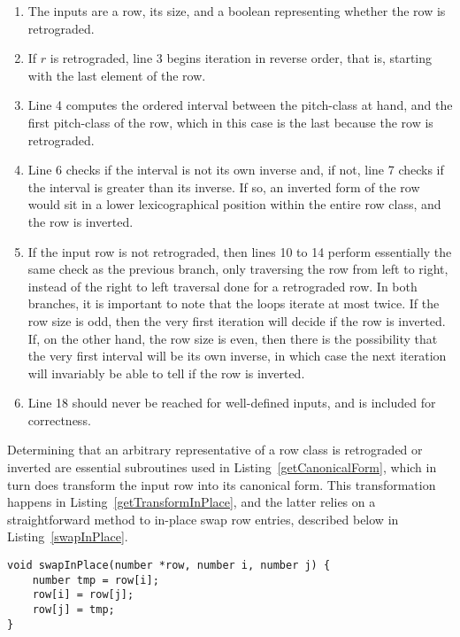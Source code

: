 \begin{enumerate}
\item The inputs are a row, its size, and a boolean representing whether the row is retrograded.
\addtocounter{enumi}{1}
\item If $r$ is retrograded, line 3 begins iteration in reverse order, that is, starting with the last element of the row.
\item Line 4 computes the ordered interval between the pitch-class at hand, and the first pitch-class of the row, which in this case is the last because the row is retrograded.
\addtocounter{enumi}{1}
\item Line 6 checks if the interval is not its own inverse and, if not, line 7 checks if the interval is greater than its inverse. If so, an inverted form of the row would sit in a lower lexicographical position within the entire row class, and the row is inverted.
\addtocounter{enumi}{3}
\item If the input row is not retrograded, then lines 10 to 14 perform essentially the same check as the previous branch, only traversing the row from left to right, instead of the right to left traversal done for a retrograded row. In both branches, it is important to note that the loops iterate at most twice. If the row size is odd, then the very first iteration will decide if the row is inverted. If, on the other hand, the row size is even, then there is the possibility that the very first interval will be its own inverse, in which case the next iteration will invariably be able to tell if the row is inverted.
\addtocounter{enumi}{7}
\item Line 18 should never be reached for well-defined inputs, and is included for correctness.
\end{enumerate}

Determining that an arbitrary representative of a row class is retrograded or inverted are essential subroutines used in Listing~\ref{getCanonicalForm}, which in turn does transform the input row into its canonical form. This transformation happens in Listing~\ref{getTransformInPlace}, and the latter relies on a straightforward method to in-place swap row entries, described below in Listing~\ref{swapInPlace}.

\begin{lstlisting}[caption={Swapping two entries in a row.},label={swapInPlace}]
void swapInPlace(number *row, number i, number j) {
    number tmp = row[i];
    row[i] = row[j];
    row[j] = tmp;
}
\end{lstlisting}

